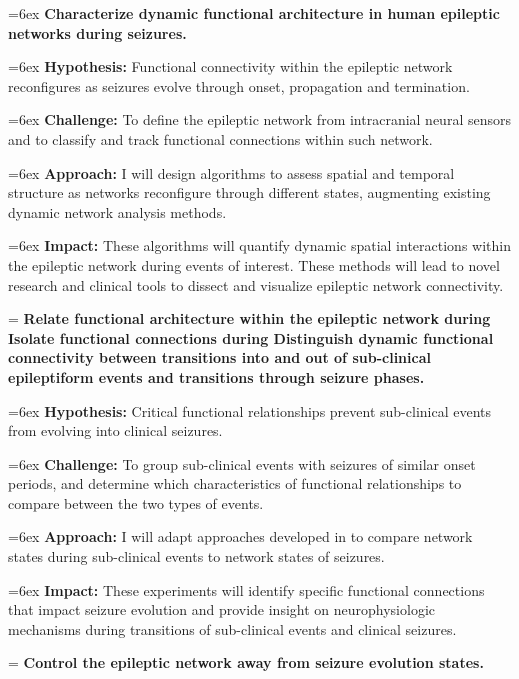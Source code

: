 \hangindent=6ex
\noindent
{} \textbf{Characterize dynamic functional architecture in human epileptic networks during seizures.}

\hangindent=6ex
\textbf{Hypothesis:} Functional connectivity within the epileptic network reconfigures as seizures evolve through onset, propagation and termination.

\hangindent=6ex
\textbf{Challenge:} To define the epileptic network from intracranial neural sensors and to classify and track functional connections within such network.

\hangindent=6ex
\textbf{Approach:} I will design algorithms to assess spatial and temporal structure as networks reconfigure through different states, augmenting existing dynamic network analysis methods.

\hangindent=6ex
\textbf{Impact:} These algorithms will quantify dynamic spatial interactions within the epileptic network during events of interest. These methods will lead to novel research and clinical tools to dissect and visualize epileptic network connectivity.


\hangindent=\parindent
{}
\noindent
{} \textbf{Relate functional architecture within the epileptic network during Isolate functional connections during Distinguish dynamic functional connectivity between transitions into and out of sub-clinical epileptiform events and transitions through seizure phases.}

\hangindent=6ex
\textbf{Hypothesis:} Critical functional relationships prevent sub-clinical events from evolving into clinical seizures.

\hangindent=6ex
\textbf{Challenge:} To group sub-clinical events with seizures of similar onset periods, and determine which characteristics of functional relationships to compare between the two types of events.

\hangindent=6ex
\textbf{Approach:} I will adapt approaches developed in  to compare network states during sub-clinical events to network states of seizures.

\hangindent=6ex
\textbf{Impact:} These experiments will identify specific functional connections that impact seizure evolution and provide insight on neurophysiologic mechanisms during transitions of sub-clinical events and clinical seizures.


\hangindent=\parindent
{}
\noindent
{} \textbf{Control the epileptic network away from seizure evolution states.}

